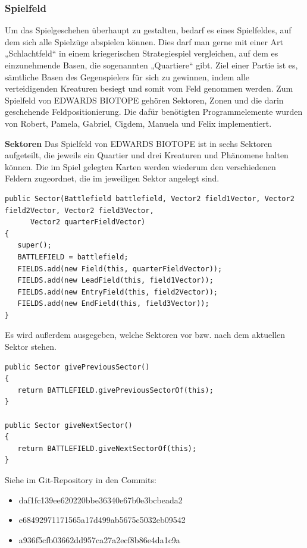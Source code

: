 \subsubsection{Spielfeld}
Um das Spielgeschehen überhaupt zu gestalten, bedarf es eines Spielfeldes, auf dem sich alle Spielzüge abspielen können.
Dies darf man gerne mit einer Art „Schlachtfeld“ in einem kriegerischen Strategiespiel vergleichen, auf dem es einzunehmende Basen, die sogenannten „Quartiere“ gibt. Ziel einer Partie ist es, sämtliche Basen des Gegenspielers für sich zu gewinnen, indem alle verteidigenden Kreaturen besiegt und somit vom Feld genommen werden.
Zum Spielfeld von EDWARDS BIOTOPE gehören Sektoren, Zonen und die darin geschehende Feldpositionierung. Die dafür benötigten Programmelemente wurden von Robert, Pamela, Gabriel, Cigdem, Manuela und Felix implementiert.

\textbf{Sektoren}
Das Spielfeld von EDWARDS BIOTOPE ist in sechs Sektoren aufgeteilt, die jeweils ein Quartier und drei Kreaturen und Phänomene halten können. Die im Spiel gelegten Karten werden wiederum den verschiedenen Feldern zugeordnet, die im jeweiligen Sektor angelegt sind.
\begin{lstlisting}
public Sector(Battlefield battlefield, Vector2 field1Vector, Vector2 field2Vector, Vector2 field3Vector,
      Vector2 quarterFieldVector)
{
   super();
   BATTLEFIELD = battlefield;
   FIELDS.add(new Field(this, quarterFieldVector));
   FIELDS.add(new LeadField(this, field1Vector));
   FIELDS.add(new EntryField(this, field2Vector));
   FIELDS.add(new EndField(this, field3Vector));
}
\end{lstlisting}

Es wird außerdem ausgegeben, welche Sektoren vor bzw. nach dem aktuellen Sektor stehen.

\begin{lstlisting}
public Sector givePreviousSector()
{
   return BATTLEFIELD.givePreviousSectorOf(this);
}

public Sector giveNextSector()
{
   return BATTLEFIELD.giveNextSectorOf(this);
}
\end{lstlisting}

Siehe im Git-Repository in den Commits:
\begin{itemize}
\item daf1fc139ee620220bbe36340e67b0e3bcbeada2
\item e68492971171565a17d499ab5675c5032eb09542
\item a936f5cfb03662dd957ca27a2ecf8b86e4da1c9a
\end{itemize}

